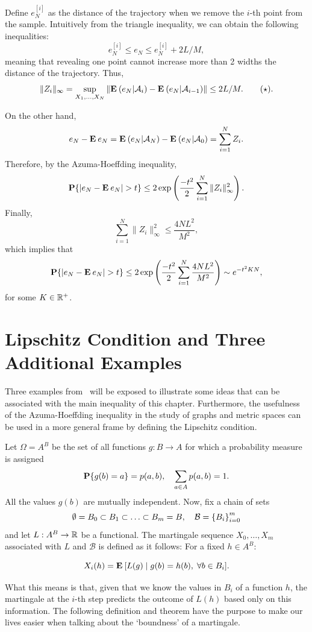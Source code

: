 Define $e_N^{[i]}$ as the distance of the trajectory when we remove the $i$-th point from the sample. Intuitively from the triangle inequality, we can obtain the following inequalities:
\[ e_N^{[i]} \leq e_N \leq e_N^{[i]} + 2 L/M, \]
meaning that revealing one point cannot increase more than 2 widths the distance of the trajectory. Thus,
\[ \|Z_i\|_\infty = \sup_{X_1,\ldots, X_N} \|\E (e_N | \A_i) - \E (e_N | \A_{i-1})\| \leq 2L/M. \tag*{$ (\star)$}.\]

On the other hand,
\[  e_N - \E e_N = \E (e_N | \A_N) - \E (e_N | \A_{0}) = \sum_{i = 1}^{N} Z_i.\]
Therefore, by the Azuma-Hoeffding inequality,
\[ \P \{ |e_N - \E e_N| > t \} \leq 2\exp\left(\frac{-t^2}{2}\sum_{i = 1}^{N} \|Z_i\|_{\infty}^2 \right). \] 
Finally,
\[ \sum_{i = 1}^{N} \|Z_i\|_{\infty}^2 \leq \frac{4NL^2}{M^2}, \]
which implies that
\[\P \{ |e_N - \E e_N| > t \} \leq 2\exp\left(\frac{-t^2}{2}\sum_{i = 1}^{N} \frac{4NL^2}{M^2} \right) \sim e^{-t^{2} K N}, \] 
for some $K\in \R^+$.

\section{Lipschitz Condition and Three Additional Examples}

Three examples from~\cite{alon2016probabilistic} will be exposed to illustrate some ideas that can be associated with the main inequality of this chapter. Furthermore, the usefulness of the Azuma-Hoeffding inequality in the study of graphs and metric spaces can be used in a more general frame by defining the Lipschitz condition.

\vspace*{1em}

Let $\Omega = A^B$ be the set of all functions $g: B\to A$ for which a probability measure is assigned
\[ \P\{g(b) = a\} = p(a,b),\hspace*{1em} \sum_{a\in A} p(a,b) = 1. \]
All the values $g(b)$ are mutually independent. Now, fix a chain of sets 
\[ \emptyset = B_0 \subset B_1 \subset \ldots \subset B_m = B,\hspace*{1em} \mathcal{B} = {\{B_i\}}_{i = 0}^m \]
and let $L: A^B \to \R$ be a functional. The martingale sequence $X_0,\ldots, X_m$ associated with $L$ and $\mathcal{B}$ is defined as it follows: For a fixed $h \in A^B$:

\[ X_i(h) = \E[ L(g) \;|\; g(b) = h(b),\; \forall b\in B_i ]. \] 

What this means is that, given that we know the values in $B_i$ of a function $h$, the martingale at the $i$-th step predicts the outcome of $L(h)$ based only on this information. The following definition and theorem have the purpose to make our lives easier when talking about the `boundness' of a martingale.

